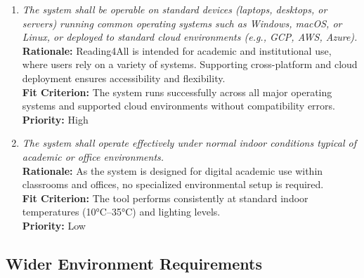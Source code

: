 \documentclass[12pt]{article}
\begin{document}
\begin{enumerate}[label=OER-EP\arabic*., wide=0pt, leftmargin=*]
  \item \emph{The system shall be operable on standard devices (laptops, desktops, or servers) running common operating systems such as Windows, macOS, or Linux, or deployed to standard cloud environments (e.g., GCP, AWS, Azure).}\\[2mm]
    {\bf Rationale:} Reading4All is intended for academic and institutional use, where users rely on a variety of systems. Supporting cross-platform and cloud deployment ensures accessibility and flexibility.\\
    {\bf Fit Criterion:} The system runs successfully across all major operating systems and supported cloud environments without compatibility errors.\\
    {\bf Priority:} High

  \item \emph{The system shall operate effectively under normal indoor conditions typical of academic or office environments.}\\[2mm]
    {\bf Rationale:} As the system is designed for digital academic use within classrooms and offices, no specialized environmental setup is required.\\
    {\bf Fit Criterion:} The tool performs consistently at standard indoor temperatures (10°C–35°C) and lighting levels.\\
    {\bf Priority:} Low
\end{enumerate}

\subsection{Wider Environment Requirements}
\end{document}
